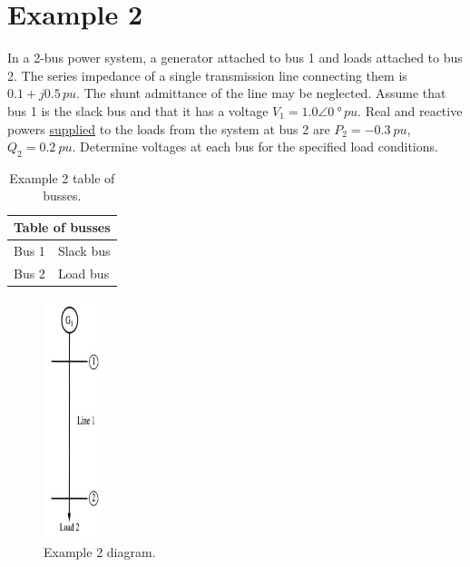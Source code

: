 \section{Example 2}
In a 2-bus power system, a generator attached to bus 1 and loads attached to bus 2. The series impedance of a single transmission line connecting them is $0.1 +j0.5\, \si{pu}$. The shunt admittance of the line may be neglected. Assume that bus 1 is the slack bus and that it has a voltage $V_1 = 1.0\angle\SI{0}{\degree}\,\si{pu}$. Real and reactive powers \underline{supplied} to the loads from the system at bus 2 are $P_2 = \SI{-0.3}{pu}$, $Q_2 = \SI{0.2}{pu}$. Determine voltages at each bus for the specified load conditions.
\begin{table}[H]
	\centering
	\begin{tabular}{@{}ll@{}}
		\toprule
		\multicolumn{2}{l}{\textbf{Table of busses}} \\
		\midrule
		Bus 1 & Slack bus                            \\
		Bus 2 & Load bus                             \\
		\bottomrule
	\end{tabular}
	\caption{Example 2 table of busses.}
\end{table}
\begin{figure}[H]
	\centering
	\includegraphics[height = 7cm]{img/figure51.png}
	\caption{Example 2 diagram.}
\end{figure}

